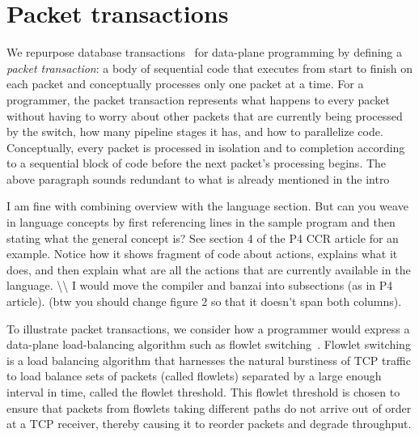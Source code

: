 \section{Packet transactions}
\label{s:transactions}

We repurpose database transactions~\cite{db_trans} for data-plane programming
by defining a \textit{packet transaction}: a body of sequential code that
executes from start to finish on each packet and conceptually processes only
one packet at a time.  For a programmer, the packet transaction represents what
happens to every packet without having to worry about other packets that are
currently being processed by the switch, how many pipeline stages it has, and
how to parallelize code. Conceptually, every packet is processed in isolation
and to completion according to a sequential block of code before the next
packet's processing begins.  \ac{The above paragraph sounds redundant to what
  is already mentioned in the intro}

\ac{I am fine with combining overview with the language section.
But can you weave in language concepts by first referencing lines in the sample
program and then stating what the general concept is? See section 4 of the
P4 CCR article for an example. Notice how it shows fragment of code about
actions, explains what it does, and then explain what are all the actions
that are currently available in the language. \\
I would move the compiler and banzai into subsections (as in P4 article).
(btw you should
change figure 2 so that it doesn't span both columns).
}

To illustrate packet transactions, we consider how a programmer would express a
data-plane load-balancing algorithm such as flowlet switching~\cite{flowlet}.
Flowlet switching is a load balancing algorithm that harnesses the natural
burstiness of TCP traffic to load balance sets of packets (called flowlets)
separated by a large enough interval in time, called the flowlet threshold.
This flowlet threshold is chosen to ensure that packets from flowlets taking
different paths do not arrive out of order at a TCP receiver, thereby causing
it to reorder packets and degrade throughput.

